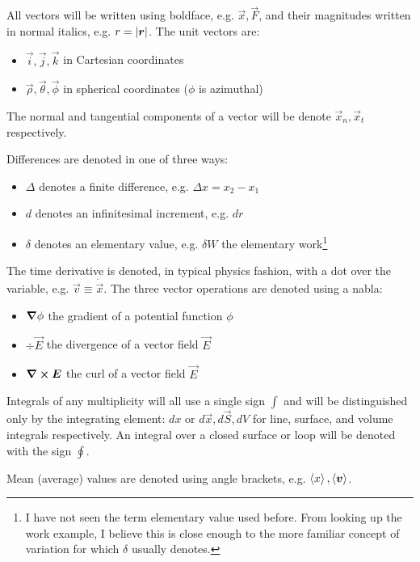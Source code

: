 \documentclass[12pt]{article}
\begin{document}
All vectors will be written using boldface, e.g. $\vec x, \vec F$, and their magnitudes written in normal italics, e.g. $r = \abs{\vec r}$. The unit vectors are:
\begin{itemize}
	\item $\vec i, \vec j, \vec k$ in Cartesian coordinates
	\item $\vec \rho, \vec \theta, \vec \phi$ in spherical coordinates ($\phi$ is azimuthal)
\end{itemize}
The normal and tangential components of a vector will be denote $\vec x_n, \vec x_t$ respectively.

Differences are denoted in one of three ways:
\begin{itemize}
	\item $\Delta$ denotes a finite difference, e.g. $\Delta x = x_2 - x_1$
	\item $d$ denotes an infinitesimal increment, e.g. $dr$
	\item $\delta$ denotes an elementary value, e.g. $\delta W$ the elementary work\footnote{I have not seen the term elementary value used before. From looking up the work example, I believe this is close enough to the more familiar concept of variation for which $\delta$ usually denotes.}
\end{itemize}

The time derivative is denoted, in typical physics fashion, with a dot over the variable, e.g. $\vec v \equiv \dot{\vec x}$. The three vector operations are denoted using a nabla:
\begin{itemize}
	\item $\grad \phi$ the gradient of a potential function $\phi$
	\item $\div \vec E$ the divergence of a vector field $\vec E$
	\item $\curl \vec E$ the curl of a vector field $\vec E$
\end{itemize}

Integrals of any multiplicity will all use a single sign $\int$ and will be distinguished only by the integrating element: $dx$ or $d\vec x, d\vec S, dV$ for line, surface, and volume integrals respectively. An integral over a closed surface or loop will be denoted with the sign $\oint$.

Mean (average) values are denoted using angle brackets, e.g. $\vbrack{x}, \vbrack{\vec v}$.


% 
\end{document}
